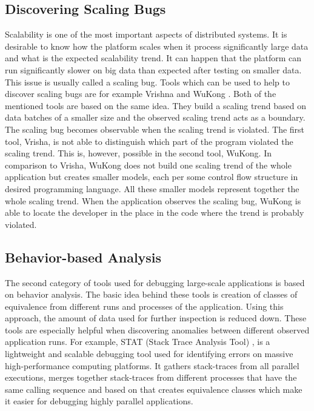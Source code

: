 \subsection{Discovering Scaling Bugs}
Scalability is one of the most important aspects of distributed systems. It is desirable to know how the platform scales when it process significantly large data and what is the expected scalability trend. It can happen that the platform can run significantly slower on big data than expected after testing on smaller data. This issue is usually called a scaling bug. Tools which can be used to help to discover scaling bugs are for example Vrishna and WuKong \cite{HPC}. Both of the mentioned tools are based on the same idea. They build a scaling trend based on data batches of a smaller size and the observed scaling trend acts as a boundary. The scaling bug becomes observable when the scaling trend is violated. The first tool, Vrisha, is not able to distinguish which part of the program violated the scaling trend. This is, however, possible in the second tool, WuKong. In comparison to Vrisha, WuKong does not build one scaling trend of the whole application but creates smaller models, each per some control flow structure in desired programming language. All these smaller models represent together the whole scaling trend. When the application observes the scaling bug, WuKong is able to locate the developer in the place in the code where the trend is probably violated.

\subsection{Behavior-based Analysis}
The second category of tools used for debugging large-scale applications is based on behavior analysis. The basic idea behind these tools is creation of classes of equivalence from different runs and processes of the application. Using this approach, the amount of data used for further inspection is reduced down. These tools are especially helpful when discovering anomalies between different observed application runs. For example, STAT (Stack Trace Analysis Tool) \cite{HPC}, is a lightweight and scalable debugging tool used for identifying errors on massive high-performance computing platforms. It gathers stack-traces from all parallel executions, merges together stack-traces from different processes that have the same calling sequence and based on that creates equivalence classes which make it easier for debugging highly parallel applications. 

